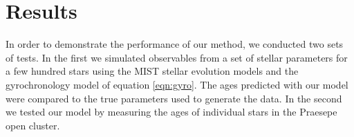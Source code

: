 \section{Results}
\label{section:results}

In order to demonstrate the performance of our method, we conducted two sets
of tests.
In the first we simulated observables from a set of stellar parameters for a
few hundred stars using the MIST stellar evolution models and the
gyrochronology model of equation \ref{eqn:gyro}.
The ages predicted with our model were compared to the true parameters used to
generate the data.
In the second we tested our model by measuring the ages of individual stars in
the Praesepe open cluster.

